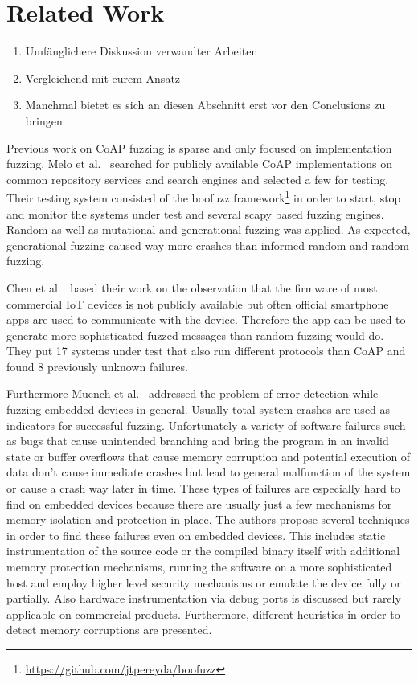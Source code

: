 \section{Related Work}

\begin{enumerate}
	\item Umfänglichere Diskussion verwandter Arbeiten
	\item Vergleichend mit eurem Ansatz
	\item Manchmal bietet es sich an diesen Abschnitt erst vor den Conclusions zu bringen
\end{enumerate}

Previous work on CoAP fuzzing is sparse and only focused on implementation fuzzing. Melo et al.~\cite{Melo2017RobustnessTO} searched for publicly available CoAP implementations on common repository services and search engines and selected a few for testing. Their testing system consisted of the boofuzz framework\footnote{\url{https://github.com/jtpereyda/boofuzz}} in order to start, stop and monitor the systems under test and several scapy based fuzzing engines. Random as well as mutational and generational fuzzing was applied. As expected, generational fuzzing caused way more crashes than informed random and random fuzzing.

Chen et al.~\cite{chen2018ndss} based their work on the observation that the firmware of most commercial IoT devices is not publicly available but often official smartphone apps are used to communicate with the device. Therefore the app can be used to generate more sophisticated fuzzed messages than random fuzzing would do. They put 17 systems under test that also run different protocols than CoAP and found 8 previously unknown failures.

Furthermore Muench et al.~\cite{EURECOM+5417} addressed the problem of error detection while fuzzing embedded devices in general. Usually total system crashes are used as indicators for successful fuzzing. Unfortunately a variety of software failures such as bugs that cause unintended branching and bring the program in an invalid state or buffer overflows that cause memory corruption and potential execution of data don't cause immediate crashes but lead to general malfunction of the system or cause a crash way later in time. These types of failures are especially hard to find on embedded devices because there are usually just a few mechanisms for memory isolation and protection in place. The authors propose several techniques in order to find these failures even on embedded devices. This includes static instrumentation of the source code or the compiled binary itself with additional memory protection mechanisms, running the software on a more sophisticated host and employ higher level security mechanisms or emulate the device fully or partially. Also hardware instrumentation via debug ports is discussed but rarely applicable on commercial products. Furthermore, different heuristics in order to detect memory corruptions are presented.

